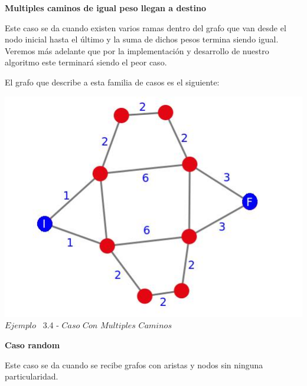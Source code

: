 \begin{center}
 \textbf{Multiples caminos de igual peso llegan a destino}
\end{center}

Este caso se da cuando existen varios ramas dentro del grafo que van desde el nodo inicial hasta el \'ultimo y la suma de dichos pesos termina siendo igual. Veremos m\'as adelante que por la implementaci\'on y desarrollo de nuestro algoritmo este terminar\'a siendo el peor caso.


El grafo que describe a esta familia de casos es el siguiente:\\

\vspace*{0.3cm} \vspace*{0.3cm}
  \begin{center}
 \includegraphics[scale=0.5]{./EJ3/grafoMultiCamino.jpeg}
 \\{$Ejemplo$ \ 3.4 - $Caso$ $Con$ $Multiples$ $Caminos$}
  \end{center}
  \vspace*{0.3cm}
  
\begin{center}
 \textbf{Caso random}
\end{center}

Este caso se da cuando se recibe grafos con aristas y nodos sin ninguna particularidad.

